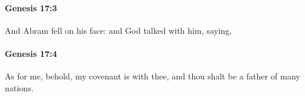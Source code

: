 		\paragraph{Genesis 17:3} %
			\label{GENESIS-17-3}

			And Abram fell on his face: and God talked with him, saying,


		\paragraph{Genesis 17:4} %
			\label{GENESIS-17-4}

			As for me, behold, my covenant is with thee, and thou shalt be a father of many nations.



